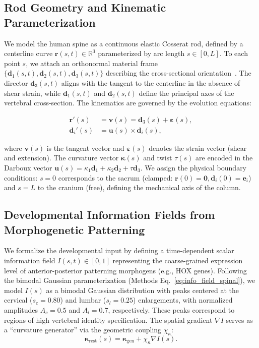 \subsection*{Rod Geometry and Kinematic Parameterization}

We model the human spine as a continuous elastic Cosserat rod, defined by a centerline curve $\mathbf{r}(s,t) \in \mathbb{R}^3$ parameterized by arc length $s \in [0, L]$. To each point $s$, we attach an orthonormal material frame $\{\mathbf{d}_1(s,t), \mathbf{d}_2(s,t), \mathbf{d}_3(s,t)\}$ describing the cross-sectional orientation~\cite{goriely2017mathematics, gazzola2018forward}. The director $\mathbf{d}_3(s,t)$ aligns with the tangent to the centerline in the absence of shear strain, while $\mathbf{d}_1(s,t)$ and $\mathbf{d}_2(s,t)$ define the principal axes of the vertebral cross-section. The kinematics are governed by the evolution equations:

\begin{align}
    \mathbf{r}'(s) &= \mathbf{v}(s) = \mathbf{d}_3(s) + \boldsymbol{\varepsilon}(s), \\
    \mathbf{d}_i'(s) &= \mathbf{u}(s) \times \mathbf{d}_i(s),
    \label{eq:cosserat_kinematics}
\end{align}

where $\mathbf{v}(s)$ is the tangent vector and $\boldsymbol{\varepsilon}(s)$ denotes the strain vector (shear and extension). The curvature vector $\boldsymbol{\kappa}(s)$ and twist $\tau(s)$ are encoded in the Darboux vector $\mathbf{u}(s) = \kappa_1 \mathbf{d}_1 + \kappa_2 \mathbf{d}_2 + \tau \mathbf{d}_3$. We assign the physical boundary conditions: $s=0$ corresponds to the sacrum (clamped: $\mathbf{r}(0)=\mathbf{0}, \mathbf{d}_i(0)=\mathbf{e}_i$) and $s=L$ to the cranium (free), defining the mechanical axis of the column.

\subsection*{Developmental Information Fields from Morphogenetic Patterning}

We formalize the developmental input by defining a time-dependent scalar information field $I(s, t) \in [0, 1]$ representing the coarse-grained expression level of anterior-posterior patterning morphogens (e.g., HOX genes). Following the bimodal Gaussian parameterization (Methods Eq.~\ref{eq:info_field_spinal}), we model $I(s)$ as a bimodal Gaussian distribution with peaks centered at the cervical ($s_c=0.80$) and lumbar ($s_l=0.25$) enlargements, with normalized amplitudes $A_c=0.5$ and $A_l=0.7$, respectively. These peaks correspond to regions of high vertebral identity specification. The spatial gradient $\nabla I$ serves as a ``curvature generator'' via the geometric coupling $\chi_\kappa$:
\begin{equation}
    \boldsymbol{\kappa}_{\mathrm{rest}}(s) = \boldsymbol{\kappa}_{\mathrm{gen}} + \chi_\kappa \nabla I(s).
    \label{eq:kappa_rest}
\end{equation}

